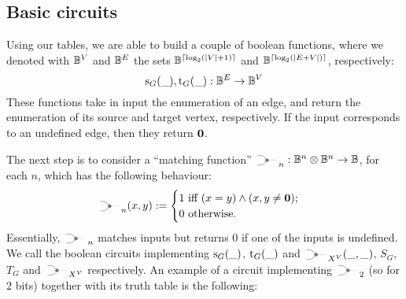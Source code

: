 \documentclass[preliminary,copyright,creativecommons,sharealike,noncommercial]{eptcs}
\begin{document}
\subsection{Basic circuits}
%
%
Using our tables, we are able to build a couple of
boolean functions, where we denoted with $\mathbb{B}^V$ and $\mathbb{B}^E$
the sets $\mathbb{B}^{ \lceil \log_2 (|V|+1) \rceil}$ and 
$\mathbb{B}^{\lceil \log_2 (|E+V|) \rceil}$, respectively:
%
%
\begin{equation*}
  \operatorname{s}_{G}(\_), \operatorname{t}_{G}(\_): \mathbb{B}^E \to \mathbb{B}^V 
\end{equation*}
%
These functions take in input the enumeration of an edge, 
and return the enumeration of its source and target vertex, respectively. 
If the input corresponds to an undefined edge, then they return $\textbf{0}$.

The next step is to consider a ``matching function'' 
$\MATCHSym_n: \Bool^n \Tensor \Bool^n \to \Bool$, for each $n$, 
which has the following behaviour:
%
%
\begin{equation*}
  \MATCHSym_n (x,y) := \begin{cases}
    1 \text{ iff } (x = y) \wedge (x,y \neq \Zero);\\
    0 \text{ otherwise}.
  \end{cases}
\end{equation*}
%
Essentially, $\MATCHSym_n$ matches inputs but returns $0$ if one of the inputs
is undefined. We call the boolean circuits implementing $\operatorname{s}_{G}(\_)$,
$\operatorname{t}_{G}(\_)$ and $\MATCHSym_{X^V}(\_, \_)$, $S_G$, $T_G$ and
$\MATCHSym_{X^V}$ respectively.
%
%
An example of a circuit implementing 
$\MATCHSym_2$ (so for $2$ bits) together
with its truth table is the following:
%
%
\end{document}
